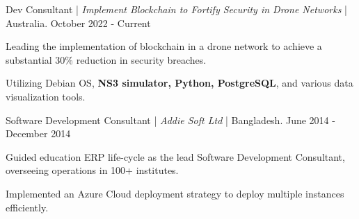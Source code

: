 
\begin{cventries2}

  \cventrynew
    {Dev Consultant | \textnormal{\textit{Implement Blockchain to Fortify Security in Drone Networks} | Australia.}} %
    {October 2022 - Current} %
    {
      \begin{cvitems} %
        \item {Leading the implementation of blockchain in a drone network to achieve a substantial 30\% reduction in security breaches.} 
        \item {Utilizing Debian OS, {\bf NS3 simulator, Python, PostgreSQL}, and various data visualization tools. }
      \end{cvitems}
      }

  \cventrynew
    {Software Development Consultant | \textnormal{\textit{Addie Soft Ltd} | Bangladesh.}} %
    {June 2014 - December 2014} %
    {
      \begin{cvitems} %
        \item {Guided education ERP life-cycle as the lead Software Development Consultant, overseeing operations in 100+ institutes.} 
        \item {Implemented an Azure Cloud deployment strategy to deploy multiple instances efficiently.}
      \end{cvitems}
      }

\end{cventries2}
